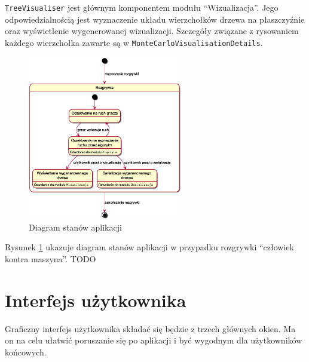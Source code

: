 \documentclass{article}
\let\oldsection\section
\renewcommand\section{\clearpage\oldsection}
\newcommand{\code}[1]{\colorbox{light-gray}{\texttt{#1}}}
\begin{document}
	\noindent \code{TreeVisualiser} jest głównym komponentem modułu ``Wizualizacja''. Jego odpowiedzialnością jest wyznaczenie układu wierzchołków drzewa na płaszczyźnie oraz wyświetlenie wygenerowanej wizualizacji. Szczegóły związane z rysowaniem każdego wierzchołka zawarte są w \code{MonteCarloVisualisationDetails}.
	
	\clearpage
	
	\begin{figure}[h]
		\centering
		\includegraphics[width=0.6\textwidth]{statediagram}
		\caption{Diagram stanów aplikacji}
		\label{rys:statediagram}
	\end{figure}

	\noindent Rysunek \ref{rys:statediagram} ukazuje diagram stanów aplikacji w przypadku rozgrywki ``człowiek kontra maszyna''. TODO
	
	
	\section{Interfejs użytkownika}
	Graficzny interfejs użytkownika składać się będzie z trzech głównych okien. Ma on na celu ułatwić poruszanie się po aplikacji i być wygodnym dla użytkowników końcowych.
\end{document}
